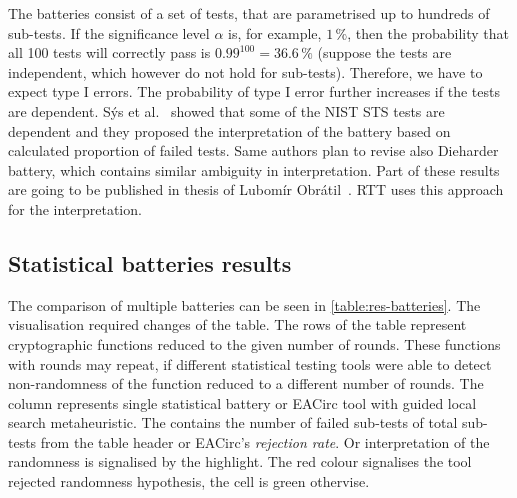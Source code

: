 \documentclass[
  print, %
  Table,   %
  nolof,     %
  nolot,     %
  11pt, %
  oneside  %
]{fithesis3}
\begin{document}
The batteries consist of a set of tests, that are parametrised up to hundreds of sub-tests. If the significance level $\alpha$ is, for example, $1\,\%$, then the probability that all 100 tests will correctly pass is $0.99^{100}=36.6\,\%$ (suppose the tests are independent, which however do not hold for sub-tests). Therefore, we have to expect type I errors. The probability of type I error further increases if the tests are dependent. Sýs et al.~\cite{sys2015interpretation} showed that some of the NIST STS tests are dependent and they proposed the interpretation of the battery based on calculated proportion of failed tests. Same authors plan to revise also Dieharder battery, which contains similar ambiguity in interpretation. Part of these results are going to be published in thesis of Lubomír Obrátil~\cite{obratilMgrThesis}. RTT uses this approach for the interpretation.

\subsection{Statistical batteries results}
\label{subsec:relatwork-stat-res}

The comparison of multiple batteries can be seen in \cref{table:res-batteries}. The visualisation required changes of the table. The rows of the table represent cryptographic functions reduced to the given number of rounds. These functions with rounds may repeat, if different statistical testing tools were able to detect non-randomness of the function reduced to a different number of rounds. The column represents single statistical battery or EACirc tool with guided local search metaheuristic. The contains the number of failed sub-tests of total sub-tests from the table header or EACirc's \textit{rejection rate}. Or interpretation of the randomness is signalised by the highlight. The red colour signalises the tool rejected randomness hypothesis, the cell is green othervise.
\end{document}
